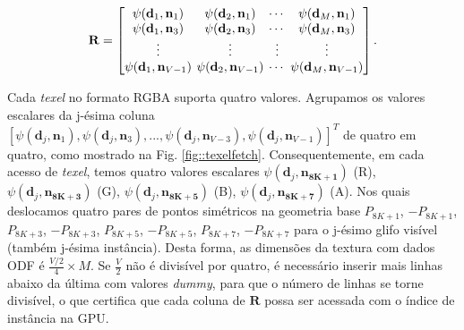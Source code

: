 \begin{equation}
\label{eq::R}
\mathbf{R} = 
\begingroup %
\setlength\arraycolsep{2pt}
\begin{bmatrix} 
    \psi(\mathbf{d}_{1}, \mathbf{n}_1) &
    \psi(\mathbf{d}_{2}, \mathbf{n}_1) & \cdots & 
    \psi(\mathbf{d}_{M}, \mathbf{n}_1)  \\
    
    \psi(\mathbf{d}_{1}, \mathbf{n}_3) &
    \psi(\mathbf{d}_{2}, \mathbf{n}_3) & \cdots & 
    \psi(\mathbf{d}_{M}, \mathbf{n}_{3}) \\ \vdots & \vdots & \vdots & \vdots  \\
    
    \psi(\mathbf{d}_{1}, \mathbf{n}_{V-1}) & 
    \psi(\mathbf{d}_{2}, \mathbf{n}_{V-1}) & \cdots & 
    \psi(\mathbf{d}_{M}, \mathbf{n}_{V-1})
\end{bmatrix}.
\endgroup
\end{equation}

Cada \textit{texel} no formato RGBA suporta quatro valores. Agrupamos os valores escalares da j-ésima coluna $[
\psi(\mathbf{d}_{j}, \mathbf{n}_1),
\psi(\mathbf{d}_{j}, \mathbf{n}_3), ...,
\psi(\mathbf{d}_{j}, \mathbf{n}_{V-3}),
\psi(\mathbf{d}_{j}, \mathbf{n}_{V-1})
]^T$ de quatro em quatro, como mostrado na Fig. \ref{fig::texelfetch}. Consequentemente, em cada acesso de \textit{texel}, temos quatro valores escalares $
\psi(\mathbf{d}_{j}, \mathbf{\mathbf{n}_{8K+1}})$ (R), $
\psi(\mathbf{d}_{j}, \mathbf{\mathbf{n}_{8K+3}})$ (G), $
\psi(\mathbf{d}_{j}, \mathbf{\mathbf{n}_{8K+5}})$ (B), $
\psi(\mathbf{d}_{j}, \mathbf{\mathbf{n}_{8K+7}})$ (A). Nos quais deslocamos quatro pares de pontos simétricos na geometria base $P_{8K+1}$, $-P_{8K+1}$, $P_{8K+3}$, $-P_{8K+3}$, $P_{8K+5}$, $-P_{8K+5}$, $P_{8K+7}$, $-P_{8K+7}$ para o j-ésimo glifo visível (também j-ésima instância). Desta forma, as dimensões da textura com dados ODF é $ \frac{V/2}{4} \times M$. Se $\frac{V}{2}$ não é divisível por quatro, é necessário inserir mais linhas abaixo da última com valores \textit{dummy}, para que o número de linhas se torne divisível, o que certifica que cada coluna de $\mathbf{R}$ possa ser acessada com o índice de instância na GPU.

